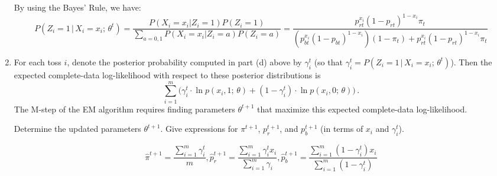 \begin{enumerate}
By using the Bayes' Rule, we have:\\
\[
P(Z_i = 1 \,|\, X_i = x_i; \,\theta^t) = \frac{P(X_i=x_i|Z_i=1)P(Z_i=1)}{\sum_{a=0,1}P(X_i=x_i|Z_i=a)P(Z_i=a)}
= \frac{p_{rt}^{x_i}(1-p_{rt})^{1-x_i}\pi_t}{(p_{bt}^{x_i}(1-p_{bt})^{1-x_i})(1-\pi_t)+p_{rt}^{x_i}(1-p_{rt})^{1-x_i}\pi_t}
\]

\item 
For each toss $i$, denote the posterior probability computed in part (d) above by $\gamma^{t}_i$ (so that $\gamma^{t}_i = P(Z_i = 1 \,|\, X_i = x_i; \, \theta^t)$).
Then the expected complete-data log-likelihood with respect to these posterior distributions is 
\[
\sum_{i=1}^m \Big( \gamma^{t}_i \cdot \ln p(x_i,1; \, \theta) + (1-\gamma^{t}_i) \cdot \ln p(x_i,0; \, \theta) \Big)
	\,.
\]
The M-step of the EM algorithm requires finding parameters $\theta^{t+1}$ that maximize this expected complete-data log-likelihood.

Determine the updated parameters $\theta^{t+1}$. Give expressions for $\pi^{t+1}$, $p_r^{t+1}$, and $p_b^{t+1}$ (in terms of $x_i$ and $\gamma^{t}_i$).

\[
\hat{\pi}^{t+1} = \frac{\sum_{i=1}^{m}\gamma_i^t}{m}, 
\hat{p}_r^{t+1} = \frac{\sum_{i=1}^{m}\gamma_i^tx_i}{\sum_{i=1}^{m}\gamma_i}, 
\hat{p}_b^{t+1} = \frac{\sum_{i=1}^{m}(1-\gamma_i^t)x_i}{\sum_{i=1}^{m}(1-\gamma_i^t)} 
\]
\end{enumerate}
